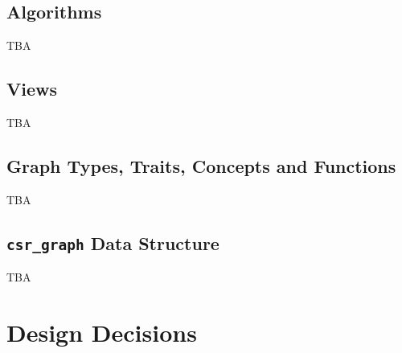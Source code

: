 \documentclass[10pt,onecolumn]{article}
\newcommand{\tcode}[1]{\lstinline[breaklines=true]{#1}}
\begin{document}
\subsection{Algorithms}
TBA

%

\subsection{Views}
TBA

\subsection{Graph Types, Traits, Concepts and Functions}
TBA

\subsection{\tcode{csr_graph} Data Structure}
TBA

\section{Design Decisions}
\end{document}
